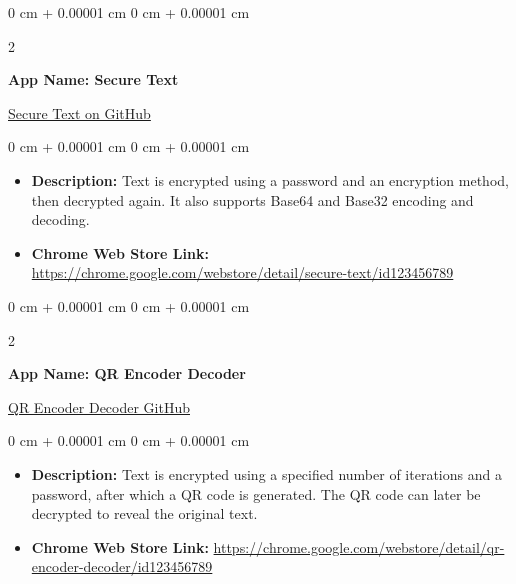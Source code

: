 \documentclass[10pt, letterpaper]{article}
\newenvironment{highlights}{
    \begin{itemize}[
        topsep=0.10 cm,
        parsep=0.10 cm,
        partopsep=0pt,
        itemsep=0pt,
        leftmargin=0 cm + 10pt
    ]
}{
    \end{itemize}
} %
\newenvironment{onecolentry}{
    \begin{adjustwidth}{
        0 cm + 0.00001 cm
    }{
        0 cm + 0.00001 cm
    }
}{
    \end{adjustwidth}
} %
\newenvironment{twocolentry}[2][]{
    \onecolentry
    \def\secondColumn{#2}
    \setcolumnwidth{\fill, 4.5 cm}
    \begin{paracol}{2}
}{
    \switchcolumn \raggedleft \secondColumn
    \end{paracol}
    \endonecolentry
} %
\begin{document}
    \begin{twocolentry}{
        \href{https://github.com/sachin6174/SecureText}{Secure Text on GitHub}
    }
        \textbf{App Name: Secure Text}
    \end{twocolentry}

    \vspace{0.10 cm}
    \begin{onecolentry}
        \begin{highlights}
            \item \textbf{Description:} Text is encrypted using a password and an encryption method, then decrypted again. It also supports Base64 and Base32 encoding and decoding.
            \item \textbf{Chrome Web Store Link:} \href{https://chrome.google.com/webstore/detail/secure-text/id123456789}{https://chrome.google.com/webstore/detail/secure-text/id123456789}
        \end{highlights}
    \end{onecolentry}

    \vspace{0.2 cm}

    \begin{twocolentry}{
        \href{https://github.com/sachin6174/QREncoderDecoder}{QR Encoder Decoder GitHub}
    }
        \textbf{App Name: QR Encoder Decoder}
    \end{twocolentry}

    \vspace{0.10 cm}
    \begin{onecolentry}
        \begin{highlights}
            \item \textbf{Description:} Text is encrypted using a specified number of iterations and a password, after which a QR code is generated. The QR code can later be decrypted to reveal the original text.
            \item \textbf{Chrome Web Store Link:} \href{https://chrome.google.com/webstore/detail/qr-encoder-decoder/id123456789}{https://chrome.google.com/webstore/detail/qr-encoder-decoder/id123456789}
        \end{highlights}
    \end{onecolentry}
\end{document}
